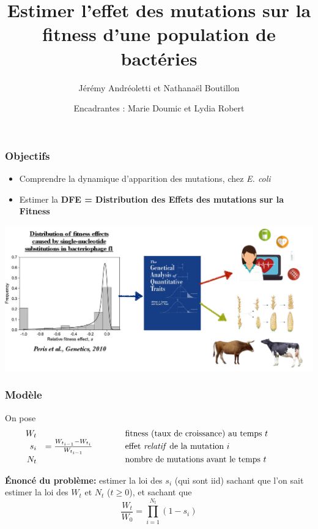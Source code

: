 \documentclass{beamer}
\title[Mutations]{Estimer l’effet des mutations sur la fitness d’une population de bactéries}
\date[2020 -- 2021]{Encadrantes : Marie Doumic et Lydia Robert}
\author[J. Andréoletti, N. Boutillon]{Jérémy Andréoletti et Nathanaël Boutillon}
\newcommand{\comment}[1]{\hspace{1cm}\text{#1}\hspace{1cm}}
\begin{document}
\begin{frame}
  \titlepage
\end{frame}


\begin{frame}
  \frametitle{Objectifs}
  \begin{itemize}[label=$\bullet$]
  \item Comprendre la dynamique d'apparition des mutations, chez \emph{E. coli}
  \item Estimer la \textbf{DFE = Distribution des Effets des mutations sur la Fitness}
  \end{itemize}
  
  \vspace{3mm}

  \begin{centering}
    \includegraphics[scale=0.2]{img/DFE_phage_2010.jpg}
  \end{centering} 
\end{frame}

\begin{frame}
  \frametitle{Modèle}
  On pose
  \[
  \begin{array}{r l l}
    W_t &&\comment{fitness (taux de croissance) au temps $t$}\\
    s_i&=\frac{W_{t_{i-1}}-W_{t_i}}{W_{t_{i-1}}}&\comment{effet \emph{relatif} de la mutation $i$}\\
    N_t &&\comment{nombre de mutations avant le temps $t$}
  \end{array}
  \]

\vspace{0.5cm}\pause

  \textbf{Énoncé du problème:} estimer la loi des $s_i$ (qui sont iid) sachant que l'on sait estimer la loi des $W_t$ et $N_t$ ($t\geqslant 0$), et sachant que \[\frac{W_t}{W_0}=\prod_{i=1}^{N_t}(1-s_i)\]
\end{frame}
\end{document}
